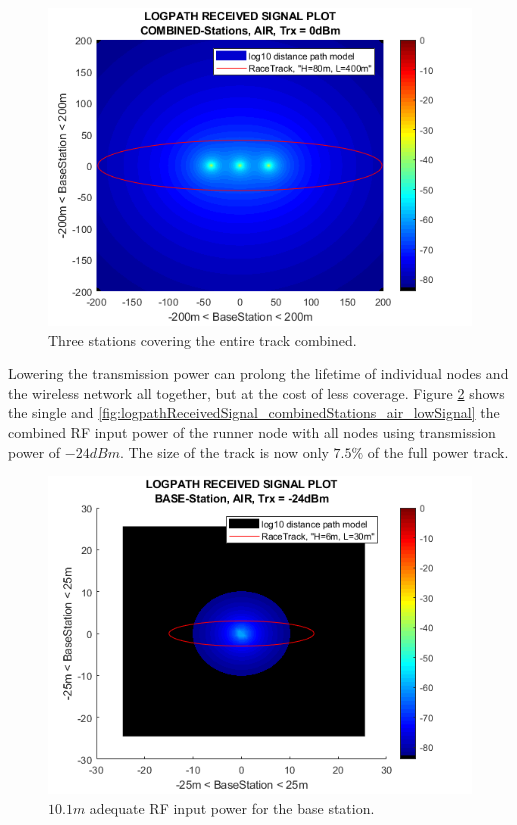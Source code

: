 \begin{figure}[h]
	\centering
	\includegraphics[width=1\linewidth]{theory/pathLoss/fig/logpathReceivedSignal_combinedStations_air_highSignal.png}
	\caption{Three stations covering the entire track combined.}
	\label{fig:logpathReceivedSignal_combinedStations_air_highSignal}
\end{figure}

\noindent Lowering the transmission power can prolong the lifetime of individual nodes and the wireless network all together, but at the cost of less coverage. Figure \ref{fig:logpathReceivedSignal_baseStation_air_lowSignal} shows the single and \ref{fig:logpathReceivedSignal_combinedStations_air_lowSignal} the combined RF input power of the runner node with all nodes using transmission power of $-24dBm$. The size of the track is now only $7.5\%$ of the full power track. 

\begin{figure}[h]
	\centering
	\includegraphics[width=1\linewidth]{theory/pathLoss/fig/logpathReceivedSignal_baseStation_air_lowSignal.png}
	\caption{$10.1m$ adequate RF input power for the base station.}
	\label{fig:logpathReceivedSignal_baseStation_air_lowSignal}
\end{figure}

